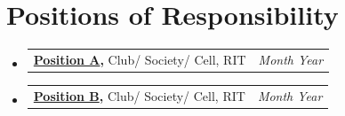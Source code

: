 \documentclass[a4paper,11pt]{article}
\makeatletter
\newcommand{\resumePOR}[3]{%
\vspace{0.5mm}\item
    \begin{tabular*}{0.97\textwidth}[t]{l@{\extracolsep{\fill}}r}
        \textbf{#1}\hspace{0.3mm}#2 & \textit{\small{#3}} 
    \end{tabular*}
    \vspace{-2mm}
}
\newcommand{\resumeSubHeadingListStart}{\begin{itemize}[leftmargin=*,labelsep=1mm]}
\newcommand{\resumeSubHeadingListEnd}{\end{itemize}\vspace{2mm}}
\makeatother
\begin{document}
\section{\textbf{Positions of Responsibility}}
\vspace{-0.4mm}
\resumeSubHeadingListStart
    \resumePOR{\href{https://www.positionlink.com}{Position A}, } %
    {Club/ Society/ Cell, RIT} %
    {Month Year} %

    \resumePOR{\href{https://www.positionlink.com}{Position B}, } %
    {Club/ Society/ Cell, RIT} %
    {Month Year} %
\resumeSubHeadingListEnd
\vspace{-5mm}
\end{document}
